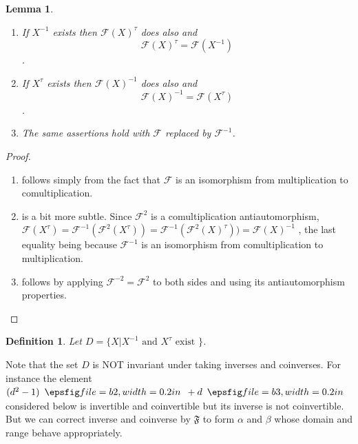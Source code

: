 \documentclass[11pt]{amsart}
\newtheorem{lemma}[theorem]{Lemma}
\newtheorem{definition}[theorem]{Definition}
\newcommand{\1}{\mathcal I}
\newcommand{\5}{\vskip 5pt}
\begin{document}
  \begin{lemma} \begin{enumerate} We have\\ 
  \item If $X^{-1}$ exists then $\mathscr F(X)^\tau $ does also and $$\mathscr F(X)^{\tau}= \mathscr F(X^{-1})$$.
 \item If $X^\tau$ exists then $\mathscr F(X)^{-1}$ does also and $$\mathscr F(X)^{-1}=\mathscr F(X^\tau)$$.
 \item The same assertions hold with $\mathscr F$ replaced by $\mathscr F^{-1}$.
  \end{enumerate}
  \end{lemma}
  \begin{proof} $\mbox{  }$\\
  \begin{enumerate}
  \item follows simply from the fact that $\mathscr F$ is an isomorphism from multiplication to comultiplication.
  \item is a bit more subtle. Since $\mathscr F^2$ is a comultiplication antiautomorphism,
 $\mathscr F(X^\tau)=\mathscr F^{-1}(\mathscr F^2 (X^\tau))=\mathscr F^{-1}(\mathscr F^2 (X)^\tau))=\mathscr F(X)^{-1}$ ,
 the last equality being because $\mathscr F^{-1}$ is an isomorphism from comultiplication to multiplication.
 \item follows by applying $\mathscr F^{-2}=\mathscr F^2$ to both sides and using its antiautomorphism properties.
 \end{enumerate}
\end{proof} 
 \begin{definition}Let $D=\{X|X^{-1} \mbox{ and } X^\tau \mbox{ exist }\}$.

 \end{definition}
 
Note that the set $D$  is NOT invariant under taking inverses and coinverses. For instance
    the element $(d^2-1)\BB + d\BC$ considered below is invertible and coinvertible but its inverse is not coinvertible. 
    But we can correct inverse and coinverse by $\mathfrak F$ to form $\alpha$ and $\beta$ whose
    domain and range behave appropriately.
    
\end{document}
